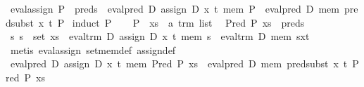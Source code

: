 \begin{isabellebody}
\endisatagproof
{\isafoldproof}%
%
\isadelimproof
\isanewline
%
\endisadelimproof
\isanewline
{}\isamarkupfalse%
\ eval{}assign{}{}\ {}P\ {}\ preds\ {}\ eval{}pred\ D\ {}assign\ D\ x\ t\ mem{}\ P\ {}\ eval{}pred\ D\ mem\ {}pred{}subst\ x\ t\ P{}{}\isanewline
%
\isadelimproof
%
\endisadelimproof
%
\isatagproof
{}\isamarkupfalse%
\ {}induct\ P{}\isanewline
\ \ \isamarkupfalse%
\ P\ \ xs\ {}{}\ {}{}a\ trm\ list{}\ \isamarkupfalse%
\ {}Pred\ P\ xs\ {}\ preds{}\isanewline
\ \ \isamarkupfalse%
\ {}{}s{}\ s\ {}\ set\ xs\ {}\ eval{}trm\ D\ {}assign\ D\ x\ t\ mem{}\ s\ {}\ eval{}trm\ D\ mem\ {}s{}x{}t{}{}{}\isanewline
\ \ \ \ \isamarkupfalse%
\ {}metis\ eval{}assign{}\ set{}mem{}def\ assign{}def{}\isanewline
\ \ \isamarkupfalse%
\ {}eval{}pred\ D\ {}assign\ D\ x\ t\ mem{}\ {}Pred\ P\ xs{}\ {}\ eval{}pred\ D\ mem\ {}pred{}subst\ x\ t\ {}Pred\ P\ xs{}{}{}\isanewline

\end{isabellebody}
